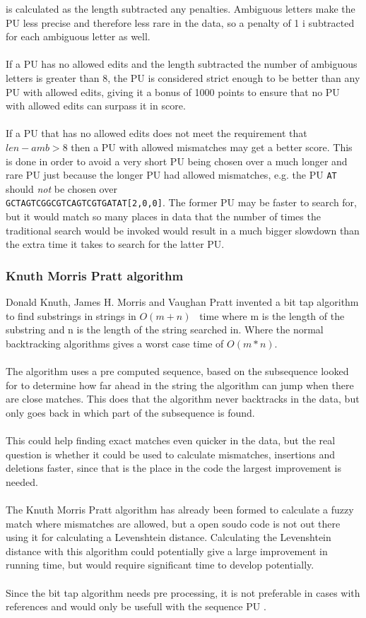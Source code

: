 \documentclass[12pt]{article}
\newcommand{\pu}{PU }
\newcommand{\pup}{PU. }
\begin{document}
is calculated as the length subtracted any penalties. Ambiguous letters make the \pu less precise and therefore less
rare in the data, so a penalty of 1 i subtracted for each ambiguous letter as well. \\ \\
If a \pu has no allowed edits and the length subtracted the number of ambiguous letters is greater than 8, 
the \pu is considered strict enough to be better than any \pu with allowed edits, giving it a bonus of 1000 points to
ensure that no \pu with allowed edits can surpass it in score. \\ \\
If a \pu that has no allowed edits does not meet the requirement that $len-amb>8$ then a \pu with allowed
mismatches may get a better score. This is done in order to avoid a very short \pu being chosen over a much longer
and rare \pu just because the longer \pu had allowed mismatches, e.g. the \pu\; \texttt{AT}\; should \emph{not} be chosen
over \\
\texttt{GCTAGTCGGCGTCAGTCGTGATAT[2,0,0]}. The former \pu may be faster to search for, but it would match so many
places in data that the number of times the traditional search would be invoked would result in a much bigger
slowdown than the extra time it takes to search for the latter \pup
\subsubsection{Knuth Morris Pratt algorithm}
Donald Knuth, James H. Morris and Vaughan Pratt invented a bit tap algorithm to find substrings in strings in $O(m+n)$~\cite{KMP}
time where m is the length of the substring and n is the length of the string searched in. 
Where the normal backtracking algorithms gives a worst case time of $O(m*n)$.\\ 
\\
The algorithm uses a pre computed sequence, based on the subsequence looked for to determine how far ahead in the string the algorithm can jump when there are close matches. This does that the algorithm never backtracks in the data, but only goes back in which part of the 
subsequence is found.\\ 
\\
This could help finding exact matches even quicker in the data, but the real question is whether it could be used to calculate mismatches, insertions and deletions faster, since that is the place in the code the largest improvement is needed. \\ \\
The Knuth Morris Pratt algorithm has already been formed to calculate a fuzzy match where mismatches are allowed, but a open soudo code is not out there using it for calculating a Levenshtein distance. Calculating the Levenshtein distance with this algorithm could potentially give a large improvement in running time, but would require significant time to develop potentially.\\
\\
Since the bit tap algorithm needs pre processing, it is not preferable in cases with references and would only be usefull with the
sequence \pu.
\end{document}
